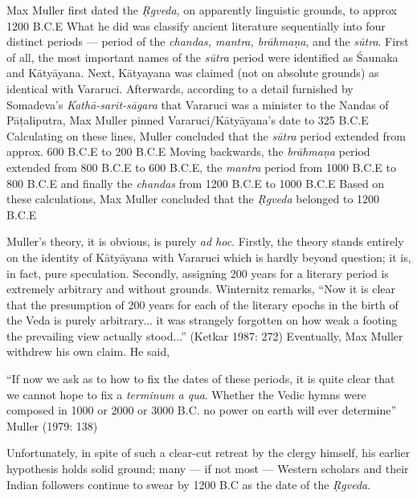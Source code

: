 Max Muller first dated the {\sl Ṛgveda}, on apparently linguistic grounds, to approx 1200 B.C.E What he did was classify ancient literature sequentially into four distinct periods --- period of the {\sl chandas, mantra, brāhmaṇa}, and the {\sl sūtra}. First of all, the most important names of the {\sl sūtra} period were identified as Śaunaka and Kātyāyana. Next, Kātyayana was claimed (not on absolute grounds) as identical with Vararuci. Afterwards, according to a detail furnished by Somadeva’s {\sl Kathā-sarit-sāgara} that Vararuci was a minister to the Nandas of Pāṭaliputra, Max Muller pinned Vararuci/Kātyāyana’s date to 325 B.C.E Calculating on these lines, Muller concluded that the {\sl sūtra} period extended from approx. 600 B.C.E to 200 B.C.E Moving backwards, the {\sl brāhmaṇa} period extended from 800 B.C.E to 600 B.C.E, the {\sl mantra} period from 1000 B.C.E to 800 B.C.E and finally the {\sl chandas} from 1200 B.C.E to 1000 B.C.E Based on these calculations, Max Muller concluded that the {\sl Ṛgveda} belonged to 1200 B.C.E  

Muller’s theory, it is obvious, is purely {\sl ad hoc}. Firstly, the theory stands entirely on the identity of Kātyāyana with Vararuci which is hardly beyond question; it is, in fact, pure speculation. Secondly, assigning 200 years for a literary period is extremely arbitrary and without grounds. Winternitz remarks, “Now it is clear that the presumption of 200 years for each of the literary epochs in the birth of the Veda is purely arbitrary... it was strangely forgotten on how weak a footing the prevailing view actually stood...” (Ketkar 1987: 272) Eventually, Max Muller withdrew his own claim. He said,

\begin{myquote}
“If now we ask as to how to fix the dates of these periods, it is quite clear that we cannot hope to fix a {\sl terminum a qua}. Whether the Vedic hymns were composed in 1000 or 2000 or 3000 B.C. no power on earth will ever determine”
\hfill Muller (1979: 138)
\end{myquote}

Unfortunately, in spite of such a clear-cut retreat by the clergy himself, his earlier hypothesis holds solid ground; many --- if not most --- Western scholars and their Indian followers continue to swear by 1200 B.C as the date of the {\sl Ṛgveda}. 

